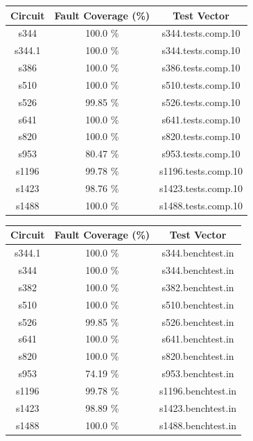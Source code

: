 \documentclass[a4paper,12pt]{article}
\begin{document}
\clearpage

\begin{center}
\begin{tabular}{||c c c||}
\hline
Circuit & Fault Coverage (\%) & Test Vector \\ [0.5ex] 
\hline\hline
s344 & 100.0 \%  & s344.tests.comp.10 \\ 
\hline
s344.1 & 100.0 \%  & s344.tests.comp.10 \\ 
\hline
s386 & 100.0 \%  & s386.tests.comp.10 \\ 
\hline
s510 & 100.0 \%  & s510.tests.comp.10 \\ 
\hline
s526 & 99.85 \%  & s526.tests.comp.10 \\ 
\hline
s641 & 100.0 \%  & s641.tests.comp.10 \\ 
\hline
s820 & 100.0 \%  & s820.tests.comp.10 \\ 
\hline
s953 & 80.47 \%  & s953.tests.comp.10 \\ 
\hline
s1196 & 99.78 \%  & s1196.tests.comp.10 \\ 
\hline
s1423 & 98.76 \%  & s1423.tests.comp.10 \\ 
\hline
s1488 & 100.0 \%  & s1488.tests.comp.10 \\ 

\hline
\hline
\end{tabular}
\end{center}

\begin{center}
\begin{tabular}{||c c c||}
\hline
Circuit & Fault Coverage (\%) & Test Vector \\ [0.5ex] 
\hline\hline
s344.1 & 100.0 \%  & s344.benchtest.in \\ 
\hline
s344 & 100.0 \%  & s344.benchtest.in \\ 
\hline
s382 & 100.0 \%  & s382.benchtest.in \\ 
\hline
s510 & 100.0 \%  & s510.benchtest.in \\ 
\hline
s526 & 99.85 \%  & s526.benchtest.in \\ 
\hline
s641 & 100.0 \%  & s641.benchtest.in \\ 
\hline
s820 & 100.0 \%  & s820.benchtest.in \\ 
\hline
s953 & 74.19 \%  & s953.benchtest.in \\ 
\hline
s1196 & 99.78 \%  & s1196.benchtest.in \\ 
\hline
s1423 & 98.89 \%  & s1423.benchtest.in \\ 
\hline
s1488 & 100.0 \%  & s1488.benchtest.in \\ 
\hline
\hline
\end{tabular}
\end{center}
\end{document}
